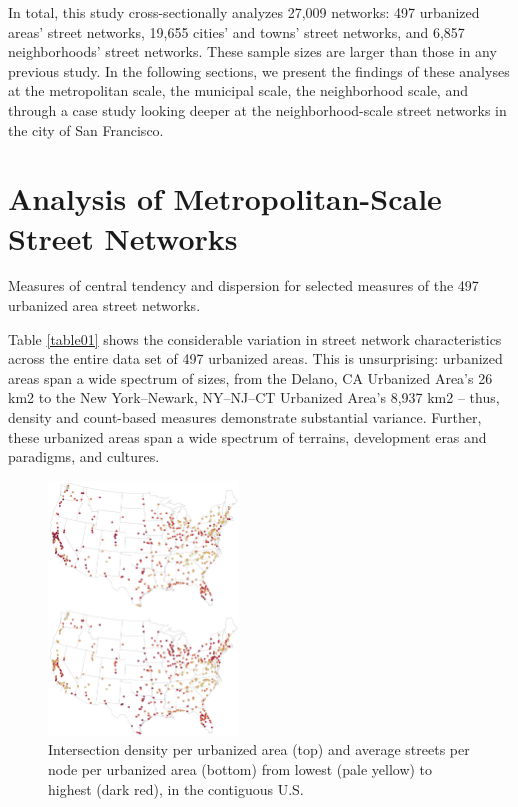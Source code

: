 \documentclass[Afour,sageh,times]{sage/sagej}
\begin{document}
In total, this study cross-sectionally analyzes 27,009 networks: 497 urbanized areas' street networks, 19,655 cities' and towns' street networks, and 6,857 neighborhoods' street networks. These sample sizes are larger than those in any previous study. In the following sections, we present the findings of these analyses at the metropolitan scale, the municipal scale, the neighborhood scale, and through a case study looking deeper at the neighborhood-scale street networks in the city of San Francisco.

\section{Analysis of Metropolitan-Scale Street Networks}

\begin{table}
\caption{Measures of central tendency and dispersion for selected measures of the 497 urbanized area street networks.}
\label{table01}
\end{table}

Table \ref{table01} shows the considerable variation in street network characteristics across the entire data set of 497 urbanized areas. This is unsurprising: urbanized areas span a wide spectrum of sizes, from the Delano, CA Urbanized Area's 26 km2 to the New York--Newark, NY--NJ--CT Urbanized Area's 8,937 km2 – thus, density and count-based measures demonstrate substantial variance. Further, these urbanized areas span a wide spectrum of terrains, development eras and paradigms, and cultures.

\begin{figure}
\includegraphics[width=0.45\textwidth]{media/fig01.png}
\caption{Intersection density per urbanized area (top) and average streets per node per urbanized area (bottom) from lowest (pale yellow) to highest (dark red), in the contiguous U.S.}
\label{fig01}
\end{figure}
\end{document}
